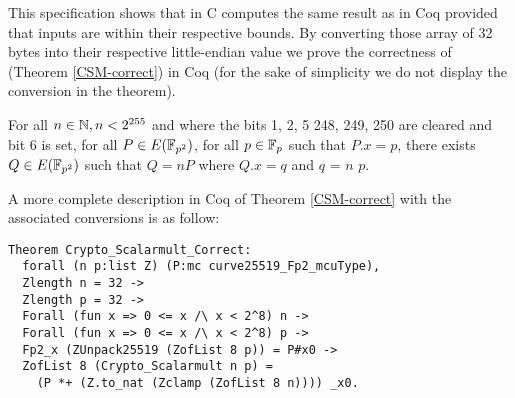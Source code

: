 This specification shows that  in C computes the same
result as  in Coq provided that inputs are within their respective
bounds.
By converting those array of 32 bytes into their respective little-endian value
we prove the correctness of  (Theorem \ref{CSM-correct})
in Coq (for the sake of simplicity we do not display the conversion in the theorem).
\begin{theorem}
\label{CSM-correct}
For all $n \in \mathbb{N}, n < 2^{255}$ and where the bits 1, 2, 5 248, 249, 250
are cleared and bit 6 is set, for all $P \in E(\mathbb{F}_{p^2})$,
for all $p \in \mathbb{F}_{p}$ such that $P.x = p$,
there exists $Q \in E(\mathbb{F}_{p^2})$ such that $Q = nP$ where $Q.x = q$ and $q$ =  $n$ $p$.
\end{theorem}
A more complete description in Coq of Theorem \ref{CSM-correct} with the associated conversions
is as follow:
\begin{lstlisting}[language=Coq]
Theorem Crypto_Scalarmult_Correct:
  forall (n p:list Z) (P:mc curve25519_Fp2_mcuType),
  Zlength n = 32 ->
  Zlength p = 32 ->
  Forall (fun x => 0 <= x /\ x < 2^8) n ->
  Forall (fun x => 0 <= x /\ x < 2^8) p ->
  Fp2_x (ZUnpack25519 (ZofList 8 p)) = P#x0 ->
  ZofList 8 (Crypto_Scalarmult n p) =
    (P *+ (Z.to_nat (Zclamp (ZofList 8 n)))) _x0.
\end{lstlisting}
